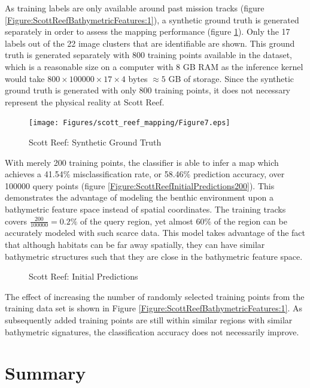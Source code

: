 			As training labels are only available around past mission tracks (figure \ref{Figure:ScottReefBathymetricFeatures:1}), a synthetic ground truth is generated separately in order to assess the mapping performance (figure \ref{Figure:ScottReefSyntheticGroundTruth}). Only the 17 labels out of the 22 image clusters that are identifiable are shown. This ground truth is generated separately with 800 training points available in the dataset, which is a reasonable size on a computer with 8 GB RAM as the inference kernel would take $800 \times 100000 \times 17 \times 4$ bytes $\approx 5$ GB of storage. Since the synthetic ground truth is generated with only 800 training points, it does not necessary represent the physical reality at Scott Reef. 
	
			\begin{figure}[!htbp]
			\centering
				\texttt{[image: Figures/scott\_reef\_mapping/Figure7.eps]}
			\caption{Scott Reef: Synthetic Ground Truth}
			\label{Figure:ScottReefSyntheticGroundTruth}
			\end{figure}
			
			With merely 200 training points, the classifier is able to infer a map which achieves a 41.54\% misclassification rate, or 58.46\% prediction accuracy, over 100000 query points (figure \ref{Figure:ScottReefInitialPredictions200}). This demonstrates the advantage of modeling the benthic environment upon a bathymetric feature space instead of spatial coordinates. The training tracks covers $\frac{200}{100000} = 0.2\%$ of the query region, yet almost 60\% of the region can be accurately modeled with such scarce data. This model takes advantage of the fact that although habitats can be far away spatially, they can have similar bathymetric structures such that they are close in the bathymetric feature space.
			
			\begin{figure}[!htbp]
			\centering
			\caption{Scott Reef: Initial Predictions}
			\label{Figure:ScottReefInitialPredictions}
			\end{figure}

			The effect of increasing the number of randomly selected training points from the training data set is shown in Figure \ref{Figure:ScottReefBathymetricFeatures:1}. As subsequently added training points are still within similar regions with similar bathymetric signatures, the classification accuracy does not necessarily improve.
												
	\section{Summary}
	
			
